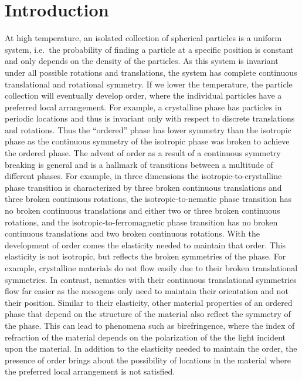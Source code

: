\chapter{Introduction}\label{c:1}
At high temperature, an isolated collection of spherical particles is a uniform system, i.e.\ the probability of finding a particle at a specific position is constant and only depends on the density of the particles.
As this system is invariant under all possible rotations and translations, the system has complete continuous translational and rotational symmetry.
If we lower the temperature, the particle collection will eventually develop order, where the individual particles have a preferred local arrangement.
For example, a crystalline phase has particles in periodic locations and thus is invariant only with respect to discrete translations and rotations.
Thus the ``ordered'' phase has lower symmetry than the isotropic phase as the continuous symmetry of the isotropic phase was broken to achieve the ordered phase.
The advent of order as a result of a continuous symmetry breaking is general and is a hallmark of transitions between a multitude of different phases. For example, in three dimensions the isotropic-to-crystalline phase transition is characterized by three broken continuous translations and three broken continuous rotations, the isotropic-to-nematic phase transition has no broken continuous translations and either two or three broken continuous rotations, and the isotropic-to-ferromagnetic phase transition has no broken continuous translations and two broken continuous rotations.
With the development of order comes the elasticity needed to maintain that order.
This elasticity is not isotropic, but reflects the broken symmetries of the phase.
For example, crystalline materials do not flow easily due to their broken translational symmetries.
In contrast, nematics with their continuous translational symmetries flow far easier as the mesogens only need to maintain their orientation and not their position.
Similar to their elasticity, other material properties of an ordered phase that depend on the structure of the material also reflect the symmetry of the phase.
This can lead to phenomena such as birefringence, where the index of refraction of the material depends on the polarization of the the light incident upon the material.
In addition to the elasticity needed to maintain the order, the presence of order brings about the possibility of locations in the material where the preferred local arrangement is not satisfied.
